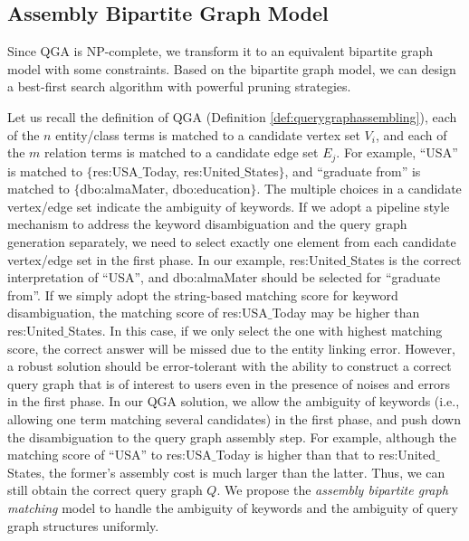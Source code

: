 \subsection{Assembly Bipartite Graph Model} \label{sec:general_case}
Since QGA is NP-complete, we transform it to an equivalent bipartite graph model with some constraints. Based on the bipartite graph model, we can design a best-first search algorithm with powerful pruning strategies.

Let us recall the definition of QGA (Definition \ref{def:querygraphassembling}), each of the $n$ entity/class terms is matched to a candidate vertex set $V_i$, and each of the $m$ relation terms is matched to a candidate edge set $E_j$. For example, ``USA'' is matched to $\{$res:USA$\_$Today, res:United$\_$States$\}$, and ``graduate from'' is matched to $\{$dbo:almaMater, dbo:education$\}$. The multiple choices in a candidate vertex/edge set indicate the ambiguity of keywords. If we adopt a pipeline style mechanism to address the keyword disambiguation and the query graph generation separately, we need to select exactly one element from each candidate vertex/edge set in the first phase. In our example, res:United$\_$States is the correct interpretation of ``USA'', and dbo:almaMater should be selected for ``graduate from''. If we simply adopt the string-based matching score \cite{li2011faerie} for keyword disambiguation, the matching score of res:USA$\_$Today may be higher than res:United$\_$States. In this case, if we only select the one with highest matching score, the correct answer will be missed due to the entity linking error. However, a robust solution should be error-tolerant with the ability to construct a correct query graph that is of interest to users even in the presence of noises and errors in the first phase. In our QGA solution, we allow the ambiguity of keywords (i.e., allowing one term matching several candidates) in the first phase, and push down the disambiguation to the query graph assembly step. For example, although the matching score of ``USA'' to res:USA$\_$Today is higher than that to res:United$\_$States, the former's assembly cost is much larger than the latter. Thus, we can still obtain the correct query graph $Q$. We propose the \emph{assembly bipartite graph matching} model to handle the ambiguity of keywords and the ambiguity of query graph structures uniformly. 

